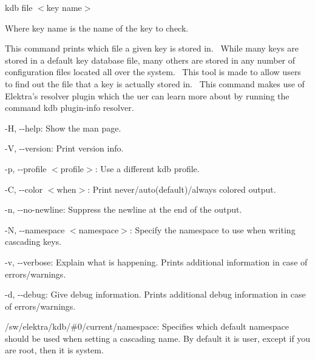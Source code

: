 {\ttfamily kdb file $<$key name$>$}~\newline


Where {\ttfamily key name} is the name of the key to check.~\newline


This command prints which file a given key is stored in.~\newline
 While many keys are stored in a default key database file, many others are stored in any number of configuration files located all over the system.~\newline
 This tool is made to allow users to find out the file that a key is actually stored in.~\newline
 This command makes use of Elektra’s {\ttfamily resolver} plugin which the uer can learn more about by running the command {\ttfamily kdb plugin-\/info resolver}.


\begin{DoxyItemize}
\item {\ttfamily -\/H}, {\ttfamily -\/-\/help}\+: Show the man page.
\item {\ttfamily -\/V}, {\ttfamily -\/-\/version}\+: Print version info.
\item {\ttfamily -\/p}, {\ttfamily -\/-\/profile $<$profile$>$}\+: Use a different kdb profile.
\item {\ttfamily -\/C}, {\ttfamily -\/-\/color $<$when$>$}\+: Print never/auto(default)/always colored output.
\item {\ttfamily -\/n}, {\ttfamily -\/-\/no-\/newline}\+: Suppress the newline at the end of the output.
\item {\ttfamily -\/N}, {\ttfamily -\/-\/namespace $<$namespace$>$}\+: Specify the namespace to use when writing cascading keys.
\item {\ttfamily -\/v}, {\ttfamily -\/-\/verbose}\+: Explain what is happening. Prints additional information in case of errors/warnings.
\item {\ttfamily -\/d}, {\ttfamily -\/-\/debug}\+: Give debug information. Prints additional debug information in case of errors/warnings.
\end{DoxyItemize}


\begin{DoxyItemize}
\item {\ttfamily /sw/elektra/kdb/\#0/current/namespace}\+: Specifies which default namespace should be used when setting a cascading name. By default it is {\ttfamily user}, except if you are root, then it is {\ttfamily system}.
\end{DoxyItemize}

